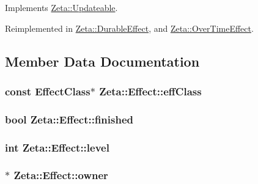 Implements \hyperlink{classZeta_1_1Updateable_af4006bfccb762454b4da08786ad93de0}{Zeta\+::\+Updateable}.



Reimplemented in \hyperlink{classZeta_1_1DurableEffect_aa9ebe74ba0c6c7b724473f3ab81b08f0}{Zeta\+::\+Durable\+Effect}, and \hyperlink{classZeta_1_1OverTimeEffect_aedb8e15db2f8320f951fed874cdb0c4c}{Zeta\+::\+Over\+Time\+Effect}.



\subsection{Member Data Documentation}
\hypertarget{classZeta_1_1Effect_aef82ce8a35dd7cb89ded50aa2e7dbebc}{
\subsubsection[{eff\+Class}]{\setlength{\rightskip}{0pt plus 5cm}const {\bf Effect\+Class}$\ast$ Zeta\+::\+Effect\+::eff\+Class\hspace{0.3cm}{\ttfamily [protected]}}}\label{classZeta_1_1Effect_aef82ce8a35dd7cb89ded50aa2e7dbebc}
\hypertarget{classZeta_1_1Effect_ad278320e1e1434a248f9ca14347c1d32}{
\subsubsection[{finished}]{\setlength{\rightskip}{0pt plus 5cm}bool Zeta\+::\+Effect\+::finished\hspace{0.3cm}{\ttfamily [protected]}}}\label{classZeta_1_1Effect_ad278320e1e1434a248f9ca14347c1d32}
\hypertarget{classZeta_1_1Effect_aec101c1a7eda022328a0b0ebb1b10c77}{
\subsubsection[{level}]{\setlength{\rightskip}{0pt plus 5cm}int Zeta\+::\+Effect\+::level\hspace{0.3cm}{\ttfamily [protected]}}}\label{classZeta_1_1Effect_aec101c1a7eda022328a0b0ebb1b10c77}
\hypertarget{classZeta_1_1Effect_a6c8500520ef68281241fd7276ea2e214}{
\subsubsection[{owner}]{$\ast$ Zeta\+::\+Effect\+::owner\hspace{0.3cm}{\ttfamily [protected]}}}\label{classZeta_1_1Effect_a6c8500520ef68281241fd7276ea2e214}
